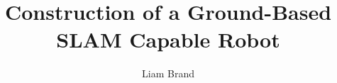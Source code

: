 \documentclass[a4paper,11pt,nocenter,bold,notitlepage,noheadline,noindent]{thesis}
\title{Construction of a Ground-Based SLAM Capable Robot}
\author{Liam Brand}
\date{}
\begin{document}
	\maketitle
	
	
	
	\tableofcontents
	\listoffigures
	\listoftables
	
	
	
	
	
	
	
	\nocite{stachniss2013robotmappingintro}
	
\end{document}
